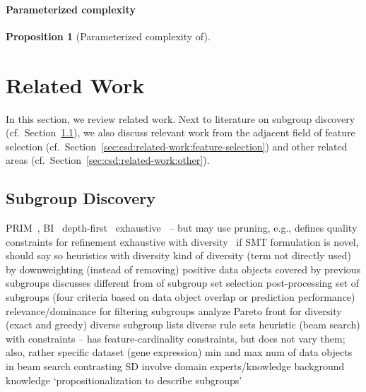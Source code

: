 \documentclass{article}
\newtheorem{proposition}{Proposition}
\theoremstyle{definition}
\begin{document}
\paragraph{Parameterized complexity}

\begin{proposition}[Parameterized complexity of]
	\label{prop:csd:complexity-alternatives-xp}
\end{proposition}

\section{Related Work}
\label{sec:csd:related-work}

In this section, we review related work.
Next to literature on subgroup discovery (cf.~Section~\ref{sec:csd:related-work:subgroup-discovery}), we also discuss relevant work from the adjacent field of feature selection (cf.~Section~\ref{sec:csd:related-work:feature-selection}) and other related areas (cf.~Section~\ref{sec:csd:related-work:other}).

\subsection{Subgroup Discovery}
\label{sec:csd:related-work:subgroup-discovery}

PRIM~\cite{friedman1999bump}, BI~\cite{mampaey2012efficient}
depth-first~\cite{millot2020optimal}
exhaustive~\cite{atzmueller2006sd, atzmueller2009fast, grosskreutz2009subgroup, lemmerich2016fast} -- but may use pruning, e.g., \cite{grosskreutz2009subgroup} defines quality constraints for refinement
exhaustive with diversity~\cite{bosc2018anytime, lemmerich2010fast}
if SMT formulation is novel, should say so
heuristics with diversity \cite{leeuwen2012diverse, lucas2018ssdp+, proencca2022robust}
kind of diversity (term not directly used) by downweighting (instead of removing) positive data objects covered by previous subgroups \cite{lavrac2004subgroup}
\cite{atzmueller2015subgroup} discusses different from of subgroup set selection
post-processing set of subgroups (four criteria based on data object overlap or prediction performance) \cite{knobbe2006pattern}
relevance/dominance for filtering subgroups \cite{grosskreutz2012enhanced}
analyze Pareto front for diversity (exact and greedy) \cite{leeuwen2013discovering}
diverse subgroup lists \cite{lopez2023discovering, lopez2023novel}
diverse rule sets \cite{zhang2020diverse}
heuristic (beam search) with constraints \cite{lavravc2006relevancy} -- has feature-cardinality constraints, but does not vary them; also, rather specific dataset (gene expression)
min and max num of data objects in beam search \cite{meeng2021real}
contrasting SD \cite{langohr2013contrasting}
involve domain experts/knowledge \cite{dzyuba2013interactive, gamberger2002expert, lemmerich2011local}
background knowledge \cite{atzmueller2005exploiting, atzmueller2006methodological}
`propositionalization to describe subgroups' \cite{zelezny2006propositionalization}
\end{document}

